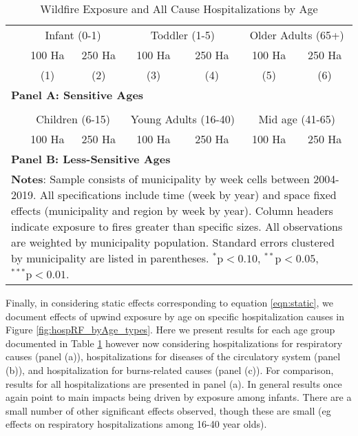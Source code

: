 \documentclass[11pt]{article}
\begin{document}
\begin{spacing}{1.5}
\begin{table}[htpb!]
    \caption{Wildfire Exposure and All Cause Hospitalizations by Age}
    \label{tab:RFhospAge}
    \centering
    \begin{tabular}{lcccccc} \\ \toprule
    & \multicolumn{2}{c}{Infant (0-1)}  & \multicolumn{2}{c}{Toddler (1-5)} & \multicolumn{2}{c}{Older Adults (65+)}
    \\ \cmidrule(r){2-3}\cmidrule(r){4-5}\cmidrule(r){6-7}
    & 100 Ha & 250 Ha & 100 Ha & 250 Ha & 100 Ha & 250 Ha\\ 
    & (1) & (2) & (3) & (4) & (5) & (6) \\ \midrule
    \multicolumn{7}{l}{\textbf{Panel A: Sensitive Ages}}\\
     
    \midrule \\
    & \multicolumn{2}{c}{Children (6-15)}  & \multicolumn{2}{c}{Young Adults (16-40)} & \multicolumn{2}{c}{Mid age (41-65)} \\ 
    \cmidrule(r){2-3}\cmidrule(r){4-5}\cmidrule(r){6-7}
    & 100 Ha & 250 Ha & 100 Ha & 250 Ha & 100 Ha & 250 Ha\\ 
    \midrule
    \multicolumn{7}{l}{\textbf{Panel B: Less-Sensitive Ages}}\\
     
    \bottomrule
    \multicolumn{7}{p{15.4cm}}{{\footnotesize \textbf{Notes}: Sample consists of municipality by week cells between 2004-2019.  All specifications include time (week by year) and space fixed effects (municipality and region by week by year).  Column headers indicate exposure to fires greater than specific sizes.  All observations are weighted by municipality population.  Standard errors clustered by municipality are listed in parentheses.   $^{*}\text{p}<0.10$, $^{**}\text{p}<0.05$, $^{***}\text{p}<0.01$.}}
    \end{tabular}
\end{table}

Finally, in considering static effects corresponding to equation \ref{eqn:static}, we document effects of upwind exposure by age on specific hospitalization causes in Figure \ref{fig:hospRF_byAge_types}.  Here we present results for each age group documented in Table \ref{tab:RFhospAge} however now considering hospitalizations for respiratory causes (panel (a)), hospitalizations for diseases of the circulatory system (panel (b)), and hospitalization for burns-related causes (panel (c)).  For comparison, results for all hospitalizations are presented in panel (a).  In general results once again point to main impacts being driven by exposure among infants.  There are a small number of other significant effects observed, though these are small (eg effects on respiratory hospitalizations among 16-40 year olds).



\end{spacing}
\end{document}
